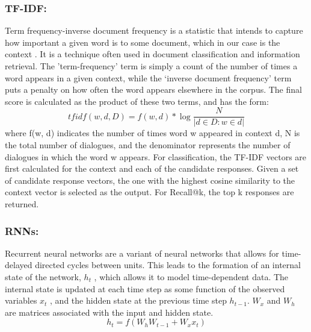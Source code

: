 \documentclass[letterpaper] {article} %
\begin{document}
\subsubsection{TF-IDF:}
Term frequency-inverse document frequency is a statistic that intends to capture how important a given word is to some document, which in our case is the context \cite{ramos2003using}. It is a technique often used in document classification and information retrieval. The 'term-frequency' term is simply a count of the number of times a word appears in a given context, while the ‘inverse document frequency’ term puts a penalty on how often the word appears elsewhere in the corpus. The final score is calculated as the product of these two terms, and has the form: 
$$
tfidf(w,d,D) = f(w,d)* \log\frac{N}{|{d \in D:w \in d}|} 
$$
where f(w, d) indicates the number of times word w appeared in context d, N is the total number of dialogues, and the denominator represents the number of dialogues in which the word w appears. For classification, the TF-IDF vectors are first calculated for the context and each of the candidate responses. Given a set of candidate response vectors, the one with the highest cosine similarity to the context vector is selected as the output. For Recall@k, the top k responses are returned. 

\subsubsection{RNNs:}
Recurrent neural networks are a variant of neural networks that allows for time-delayed directed cycles between units\cite{medsker1999recurrent}. This leads to the formation of an internal state of the network, $h_t$ , which allows it to model time-dependent data. The internal state is updated at each time step as some function of the observed variables $x_t$ , and the hidden state at the previous time step $h_{t-1}$. $W_x$ and $W_h$ are matrices associated with the input and hidden state.
$$
h_t = f(W_h W_{t-1} + W_x x_t)
$$
\end{document}
